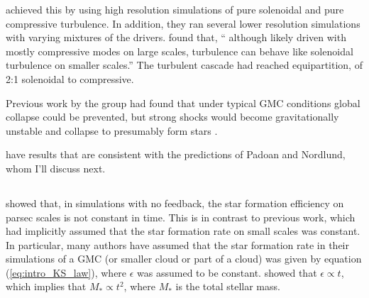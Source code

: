 \documentclass[../dissertation.tex]{subfiles}
\begin{document}
\citet{2010A&A...512A..81F} achieved this by using high resolution simulations of pure solenoidal and pure compressive turbulence. 
In addition, they ran several lower resolution simulations with varying mixtures of the drivers.
\citet{2010A&A...512A..81F} found that, `` although likely driven with mostly compressive modes on large scales, turbulence can behave like solenoidal turbulence on smaller scales.''
The turbulent cascade had reached equipartition, of 2:1 solenoidal to compressive. 

Previous work by the group had found that under typical GMC conditions global collapse could be prevented, 
but strong shocks would become gravitationally unstable and collapse to presumably form stars \citep{2000ApJ...535..887K}.

\citet{2004ApJ...605..800L} have results that are consistent with the predictions of Padoan and Nordlund, whom I'll discuss next.

%
%

\subsection{\citet{2015ApJ...800...49L}} \label{Lee15_model}

\citet{2015ApJ...800...49L} showed that, in simulations with no feedback, the star formation efficiency on
parsec scales is not constant in time.
This is in contrast to previous work, which had implicitly assumed that the star formation rate on small scales was constant.
In particular, many authors have assumed that the star formation rate in their simulations of a GMC (or smaller cloud or part of a cloud) was given by equation (\ref{eq:intro_KS_law}), where $\epsilon$ was assumed to be constant.
\citet{2015ApJ...800...49L} showed that $\epsilon \propto t$, which implies that $M_* \propto t^2$, where $M_*$ is the total stellar mass.
\end{document}
